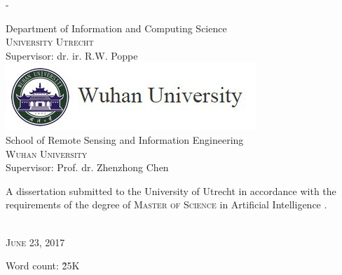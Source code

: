 \begin{titlingpage}
\begin{SingleSpace}
\begin{adjustwidth*}{\unitlength}{-\unitlength}
\begin{center}
{\large Department of Information and Computing Science  \\
	\textsc{University Utrecht}}\\
{\large Supervisor: dr. ir. R.W. Poppe}\\
\vspace{6mm}
\includegraphics[scale=0.6]{logos/whu_2.png}\\
\vspace{3mm}
{\large School of Remote Sensing and Information Engineering  \\
	\textsc{Wuhan University}}\\
{\large Supervisor: Prof. dr. Zhenzhong Chen}\\
\vspace{11mm}
\begin{minipage}{10cm}
A dissertation submitted to the University of Utrecht in accordance with the requirements of the degree of \textsc{Master of Science} in Artificial Intelligence .
\end{minipage}\\
\vspace{9mm}
{\large\textsc{June 23, 2017}}
\vspace{12mm}
\end{center}
\begin{flushright}
{\small Word count: \~25K}
\end{flushright}
\end{adjustwidth*}
\end{SingleSpace}
\end{titlingpage}